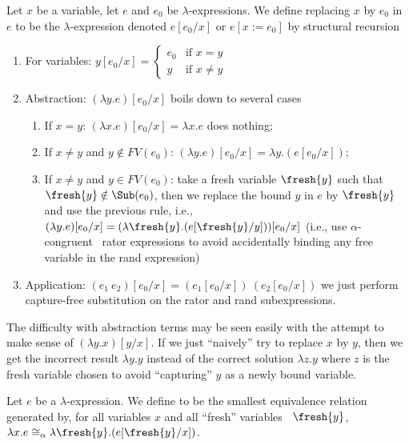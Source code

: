 \begin{node}[Syntax]
\begin{definition}\label{untyped-lambda-000E}%
Let $x$ be a variable, let $e$ and $e_{0}$ be $\lambda$-expressions. We
define  replacing $x$ by $e_{0}$ in $e$
to be the $\lambda$-expression denoted $e[e_{0}/x]$ or $e[x:=e_{0}]$ by
structural recursion
\begin{enumerate}
\item For variables: $\displaystyle y[e_{0}/x]=\begin{cases}e_{0} & \mbox{if }x=y\\ y & \mbox{if }x\neq y \end{cases}$
\item Abstraction: $(\lambda y.e)[e_{0}/x]$ boils down to several cases
\begin{enumerate}
\item If $x=y$: $(\lambda x.e)[e_{0}/x]=\lambda x.e$ does nothing;
\item If $x\neq y$ and $y\notin FV(e_{0})$: $(\lambda y.e)[e_{0}/x]=\lambda y.(e[e_{0}/x])$;
\item If $x\neq y$ and $y\in FV(e_{0})$: take a fresh variable  $\fresh{y}$
  such that $\fresh{y}\notin\Sub(e_{0})$, then we replace the bound $y$
  in $e$ by $\fresh{y}$ and use the previous rule, i.e.,
  $(\lambda y.e)[e_{0}/x]=(\lambda \fresh{y}.(e[\fresh{y}/y]))[e_{0}/x]$
  (i.e., use $\alpha$-congruent~ rator
  expressions to avoid accidentally binding any free variable in the
  rand expression)
\end{enumerate}
\item Application: $(e_{1}~e_{2})[e_{0}/x] = (e_{1}[e_{0}/x])~(e_{2}[e_{0}/x])$
  we just perform capture-free substitution on the rator and rand subexpressions.
\end{enumerate}
\end{definition}

\begin{node}[Example]\label{untyped-lambda-000M}%
The difficulty with abstraction terms may be seen easily with the
attempt to make sense of $(\lambda y.x)[y/x]$. If we just ``naively''
try to replace $x$ by $y$, then we get the incorrect result $\lambda y.y$
instead of the correct solution $\lambda z.y$ where $z$ is the fresh
variable chosen to avoid ``capturing'' $y$ as a newly bound variable.
\end{node}

\begin{definition}\label{untyped-lambda-000V}%
Let $e$ be a $\lambda$-expression. We define
 to be the smallest equivalence relation
generated by, for all variables $x$ and all ``fresh''
variables~ $\fresh{y}$, $\lambda x.e
\cong_{\alpha}\lambda\fresh{y}.(e[\fresh{y}/x])$.


\end{definition}
\end{node}
